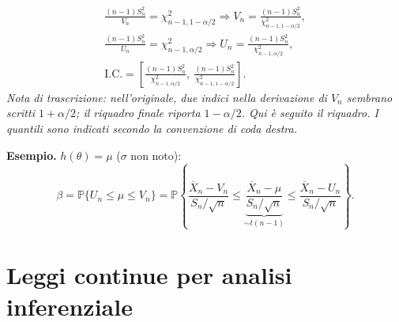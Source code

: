 \begin{gather*}
\frac{(n-1)S_n^2}{V_n}=\chi^2_{n-1,1-\alpha/2}\Rightarrow V_n=\frac{(n-1)S_n^2}{\chi^2_{n-1,1-\alpha/2}},\\
\frac{(n-1)S_n^2}{U_n}=\chi^2_{n-1,\alpha/2}\Rightarrow U_n=\frac{(n-1)S_n^2}{\chi^2_{n-1,\alpha/2}},\\
\boxed{\mathrm{I.C.}=\left[\frac{(n-1)S_n^2}{\chi^2_{n-1,\alpha/2}},\ \frac{(n-1)S_n^2}{\chi^2_{n-1,1-\alpha/2}}\right]}.
\end{gather*}
\emph{Nota di trascrizione: nell'originale, due indici nella derivazione di $V_n$ sembrano scritti $1+\alpha/2$; il riquadro finale riporta $1-\alpha/2$. Qui è seguito il riquadro. I quantili sono indicati secondo la convenzione di coda destra.}
\begin{center}\end{center}
\textbf{Esempio.} $h(\theta)=\mu$ ($\sigma$ non noto):
\[\beta=\mathbb P\{U_n\le\mu\le V_n\}
=\mathbb P\left\{\frac{\overline X_n-V_n}{S_n/\sqrt n}\le\underbrace{\frac{\overline X_n-\mu}{S_n/\sqrt n}}_{\sim t(n-1)}\le\frac{\overline X_n-U_n}{S_n/\sqrt n}\right\}.\]
\section*{Leggi continue per analisi inferenziale}
